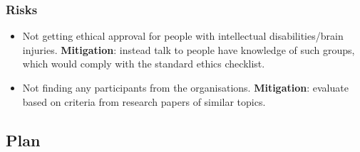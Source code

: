 \documentclass[11pt]{article}
\begin{document}
\subsubsection{Risks}\label{risks}

\begin{itemize}
    \item Not getting ethical approval for people with intellectual disabilities/brain injuries. \textbf{Mitigation}: instead talk to people have knowledge of such groups, which would comply with the standard ethics checklist. 
    \item Not finding any participants from the organisations. \textbf{Mitigation}: evaluate based on criteria from research papers of similar topics. 
\end{itemize}

\subsection{Plan}\label{plan}
\end{document}
